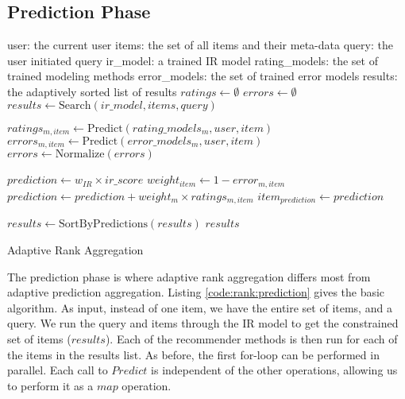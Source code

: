 \subsection{Prediction Phase}

\begin{algorithm}[t]
  \begin{algorithmic}[1]
  \REQUIRE user: the current user
  \REQUIRE items: the set of all items and their meta-data
  \REQUIRE query: the user initiated query
  \REQUIRE ir\_model: a trained IR model
  \REQUIRE rating\_models: the set of trained modeling methods 
  \REQUIRE error\_models: the set of trained error models
  \ENSURE  results: the adaptively sorted list of results
    \STATE $ratings \gets \emptyset$
    \STATE $errors  \gets \emptyset$
    \STATE $results \gets \mathrm{Search}(ir\_model, items, query)$
    
        \STATE $ratings_{m,item} \gets \mathrm{Predict}(rating\_models_m, user, item)$
        \STATE $errors_{m,item}  \gets \mathrm{Predict}(error\_models_m, user, item)$
      \ENDFOR 
    \ENDFOR
    \STATE $errors \gets \mathrm{Normalize}(errors)$

      \STATE $prediction \gets w_{IR} \times ir\_score$
        \STATE $weight_{item} \gets 1 - error_{m,item}$
        \STATE $prediction \gets prediction + weight_m \times ratings_{m,item}$
      \ENDFOR
      \STATE $item_{prediction} \gets prediction$
    \ENDFOR
    
    \STATE $results \gets \mathrm{SortByPredictions}(results)$
  \RETURN $results$

  \end{algorithmic}
  \caption[Adaptive Rank Aggregation]{Adaptive Rank Aggregation}
  \label{code:rank:prediction}
\end{algorithm}

The prediction phase is where adaptive rank aggregation differs most from adaptive prediction aggregation.
Listing \ref{code:rank:prediction} gives the basic algorithm.
As input, instead of one item, we have the entire set of items, and a query.
We run the query and items through the IR model to get the constrained set of items ($results$).
Each of the recommender methods is then run for each of the items in the results list.
As before, the first for-loop can be performed in parallel.
Each call to $Predict$ is independent of the other operations,
allowing us to perform it as a $map$ operation.

